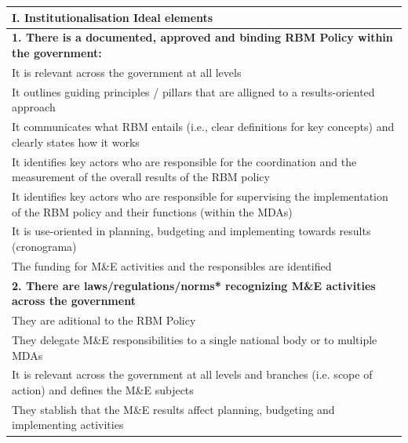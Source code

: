 \documentclass[
  10pt,
]{book}
\begin{document}
\begin{table}
\centering
\begin{tabular}[t]{l}
\hline
I. Institutionalisation Ideal elements\\
\hline
\multicolumn{1}{l}{\textbf{1. There is a documented, approved and binding RBM Policy within the government:}}\\
\hline
\hspace{1em}It is relevant across the government at all levels\\
\hline
\hspace{1em}It outlines guiding principles / pillars that are alligned to a results-oriented approach\\
\hline
\hspace{1em}It communicates what RBM entails (i.e., clear definitions for key concepts) and clearly states how it works\\
\hline
\hspace{1em}It identifies key actors who are responsible for the coordination and the measurement of the overall results of the RBM policy\\
\hline
\hspace{1em}It identifies key actors who are responsible for supervising the implementation of the RBM policy and their functions (within the MDAs)\\
\hline
\hspace{1em}It is use-oriented in planning, budgeting and implementing towards results (cronograma)\\
\hline
\hspace{1em}The funding for M\&E activities and the responsibles are identified\\
\hline
\multicolumn{1}{l}{\textbf{2. There are laws/regulations/norms* recognizing M\&E activities across the government}}\\
\hline
\hspace{1em}They are aditional to the RBM Policy\\
\hline
\hspace{1em}They delegate M\&E responsibilities to a single national body or to multiple MDAs\\
\hline
\hspace{1em}It is relevant across the government at all levels and branches (i.e. scope of action) and defines the M\&E subjects\\
\hline
\hspace{1em}They stablish that the M\&E results affect planning, budgeting and implementing activities\\

\end{tabular}
\end{table}
\end{document}
